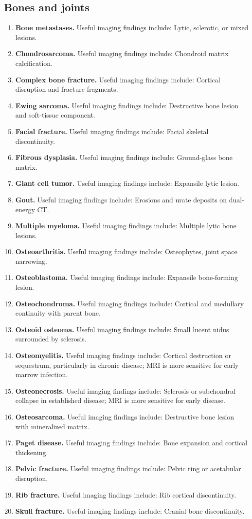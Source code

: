 \subsection{Bones and joints}
\begin{enumerate}[leftmargin=*,itemsep=0.45em,topsep=0.4em]
\item \textbf{Bone metastases.} Useful imaging findings include: Lytic, sclerotic, or mixed lesions.
\item \textbf{Chondrosarcoma.} Useful imaging findings include: Chondroid matrix calcification.
\item \textbf{Complex bone fracture.} Useful imaging findings include: Cortical disruption and fracture fragments.
\item \textbf{Ewing sarcoma.} Useful imaging findings include: Destructive bone lesion and soft-tissue component.
\item \textbf{Facial fracture.} Useful imaging findings include: Facial skeletal discontinuity.
\item \textbf{Fibrous dysplasia.} Useful imaging findings include: Ground-glass bone matrix.
\item \textbf{Giant cell tumor.} Useful imaging findings include: Expansile lytic lesion.
\item \textbf{Gout.} Useful imaging findings include: Erosions and urate deposits on dual-energy CT.
\item \textbf{Multiple myeloma.} Useful imaging findings include: Multiple lytic bone lesions.
\item \textbf{Osteoarthritis.} Useful imaging findings include: Osteophytes, joint space narrowing.
\item \textbf{Osteoblastoma.} Useful imaging findings include: Expansile bone-forming lesion.
\item \textbf{Osteochondroma.} Useful imaging findings include: Cortical and medullary continuity with parent bone.
\item \textbf{Osteoid osteoma.} Useful imaging findings include: Small lucent nidus surrounded by sclerosis.
\item \textbf{Osteomyelitis.} Useful imaging findings include: Cortical destruction or sequestrum, particularly in chronic disease; MRI is more sensitive for early marrow infection.
\item \textbf{Osteonecrosis.} Useful imaging findings include: Sclerosis or subchondral collapse in established disease; MRI is more sensitive for early disease.
\item \textbf{Osteosarcoma.} Useful imaging findings include: Destructive bone lesion with mineralized matrix.
\item \textbf{Paget disease.} Useful imaging findings include: Bone expansion and cortical thickening.
\item \textbf{Pelvic fracture.} Useful imaging findings include: Pelvic ring or acetabular disruption.
\item \textbf{Rib fracture.} Useful imaging findings include: Rib cortical discontinuity.
\item \textbf{Skull fracture.} Useful imaging findings include: Cranial bone discontinuity.
\end{enumerate}


